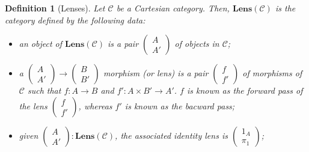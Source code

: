 \documentclass[11pt,a4paper,openright,twoside]{report}
\newcounter{mycounter}
\theoremstyle{plain}
\newtheorem{definition}[mycounter]{Definition}
\theoremstyle{definition}
\begin{document}
\begin{definition}[Lenses]
  \label{def: lenses}
  Let $\mathcal{C}$ be a Cartesian category. Then, $\mathbf{Lens}(\mathcal{C})$ is the category defined by the following data:
  \begin{itemize}
    \item an object of $\mathbf{Lens}(\mathcal{C})$ is a pair $\left(\begin{smallmatrix} A \\ A' \end{smallmatrix}\right)$ of objects in $\mathcal{C}$; 
    
    \item a $\left(\begin{smallmatrix} A \\ A' \end{smallmatrix}\right) \to \left(\begin{smallmatrix} B \\ B' \end{smallmatrix}\right)$ morphism (or lens) is a pair $\left(\begin{smallmatrix} f \\ f' \end{smallmatrix}\right)$ of morphisms of $\mathcal{C}$ such that $f: A \to B$ and $f': A \times B' \to A'$. $f$ is known as the forward pass of the lens $\left(\begin{smallmatrix} f \\ f' \end{smallmatrix}\right)$, whereas $f'$ is known as the bacward pass;
    
    \item given $\left(\begin{smallmatrix} A \\ A' \end{smallmatrix}\right) : \mathbf{Lens}(\mathcal{C})$, the associated identity lens is $\left(\begin{smallmatrix} 1_A \\ \pi_1 \end{smallmatrix}\right)$;
    

\end{itemize}
\end{definition}
\end{document}
